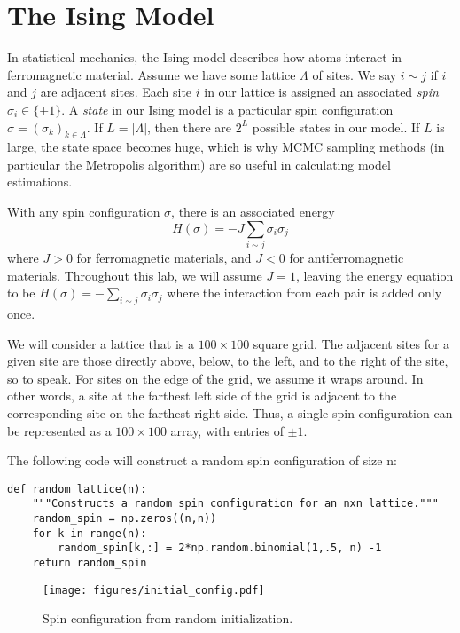 \section*{The Ising Model}
In statistical mechanics, the Ising model describes how atoms interact in ferromagnetic material. Assume we have some lattice $\Lambda$ of sites. We say $i \sim j$ if $i$ and $j$ are adjacent sites. Each site $i$ in our lattice is assigned an associated \emph{spin} $\sigma_{i} \in \{\pm 1\}$. A \emph{state} in our Ising model is a particular spin configuration $\sigma = (\sigma_{k})_{k \in \Lambda}$. If $L = |\Lambda|$, then there are $2^{L}$ possible states in our model. If $L$ is large, the state space becomes huge, which is why MCMC sampling methods (in particular the Metropolis algorithm) are so useful in calculating model estimations.

With any spin configuration $\sigma$, there is an associated energy
\[
H(\sigma) = -J \sum_{i \sim j} \sigma_{i} \sigma_{j}
\]
 where $J > 0$ for ferromagnetic materials, and $J < 0$ for antiferromagnetic materials. Throughout this lab, we will assume $J = 1$, leaving the energy equation to be $H(\sigma) = -\sum_{i \sim j} \sigma_{i}\sigma_{j}$ where the interaction from each pair is added only once.

We will consider a lattice that is a $100 \times 100$ square grid.
The adjacent sites for a given site are those directly above, below, to the left, and to the right of the site, so to speak.
For sites on the edge of the grid, we assume it wraps around.
In other words, a site at the farthest left side of the grid is adjacent to the corresponding site on the farthest right side.
Thus, a single spin configuration can be represented as a $100 \times 100$ array, with entries of $\pm 1$.

The following code will construct a random spin configuration of size n:

\begin{lstlisting}
def random_lattice(n):
    """Constructs a random spin configuration for an nxn lattice."""
    random_spin = np.zeros((n,n))
    for k in range(n):
        random_spin[k,:] = 2*np.random.binomial(1,.5, n) -1
    return random_spin
\end{lstlisting}

\begin{figure}[H]
\centering
\texttt{[image: figures/initial\_config.pdf]}
\caption{Spin configuration from random initialization.}
\label{fig:random_spin}
\end{figure}

